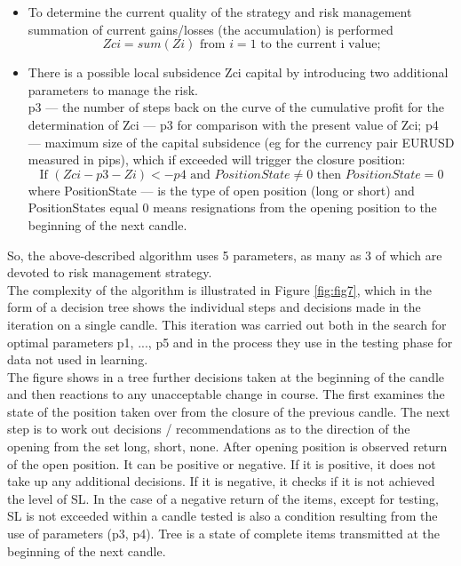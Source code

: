 \documentclass[runningheads,a4paper]{llncs}
\begin{document}
\begin{itemize}
\item To determine the current quality of the strategy and risk management summation of current gains/losses (the accumulation) is performed
\begin{equation}
Zci = sum ( Zi ) \text{ from } i = 1 \text{ to the current i value;}
\end{equation}
\item There is a possible local subsidence Zci capital by introducing two additional parameters to manage the risk.\\
p3 --- the number of steps back on the curve of the cumulative profit for the determination of Zci --- p3 for comparison with the present value of Zci;
p4 --- maximum size of the capital subsidence (eg for the currency pair EURUSD measured in pips), which if exceeded will trigger the closure position:\\
\begin{equation}
\text{If } ( Zci - p3 - Zi ) <- p4 \text{ and } PositionState \neq 0 \text{ then } PositionState = 0
\end{equation} 
where PositionState --- is the type of open position (long or short) and PositionStates equal 0 means resignations from the opening position to the beginning of the next candle.
\end{itemize}
So, the above-described algorithm uses 5 parameters, as many as 3 of which are devoted to risk management strategy.\\
The complexity of the algorithm is illustrated in Figure \ref{fig:fig7}, which in the form of a decision tree shows the individual steps and decisions made in the iteration on a single candle. This iteration was carried out both in the search for optimal parameters p1, ..., p5 and in the process they use in the testing phase for data not used in learning.\\

The figure shows in a tree further decisions taken at the beginning of the candle and then reactions to any unacceptable change in course. The first examines the state of the position taken over from the closure of the previous candle. The next step is to work out decisions / recommendations as to the direction of the opening from the set {long, short, none}. After opening position is observed return of the open position. It can be positive or negative. If it is positive, it does not take up any additional decisions. If it is negative, it checks if it is not achieved the level of SL. In the case of a negative return of the items, except for testing, SL is not exceeded within a candle tested is also a condition resulting from the use of parameters (p3, p4). Tree is a state of complete items transmitted at the beginning of the next candle.
\end{document}

